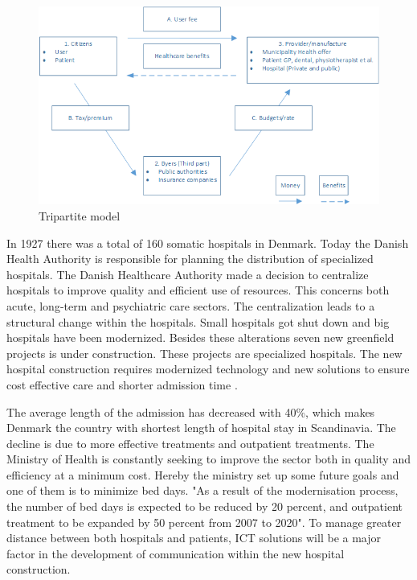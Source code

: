 \begin{figure}[H]
\centering
\includegraphics[width=1\textwidth]{Figure/thirdpart.png}
\caption{Tripartite model \cite{sundhedsvaesen}}
\label{Trepartmodel}
\end{figure} 

In 1927 there was a total of 160 somatic hospitals in Denmark. Today the Danish Health Authority is responsible for planning the distribution of specialized hospitals. The Danish Healthcare Authority made a decision to centralize hospitals to improve quality and efficient use of resources. This concerns both acute, long-term and psychiatric care sectors.
The centralization leads to a structural change within the hospitals. Small hospitals got shut down and big hospitals have been modernized. Besides these alterations seven new greenfield projects is under construction. These projects are specialized hospitals. The new hospital construction requires modernized technology and new solutions to ensure cost effective care and shorter admission time \cite{Healthcareindk2}. 

The average length of the admission has decreased with 40\%, which makes Denmark the country with shortest length of hospital stay in Scandinavia. The decline is due to more effective treatments and outpatient treatments. The Ministry of Health is constantly seeking to improve the sector both in quality and efficiency at a minimum cost. Hereby the ministry set up some future goals and one of them is to minimize bed days. "As a result of the modernisation process, the number of bed days is expected to be reduced by 20 percent, and outpatient treatment to be expanded by 50 percent from 2007 to 2020". To manage greater distance between both hospitals and patients, ICT solutions will be a major factor in the development of communication within the new hospital construction\cite{DKhealthreview, Healthcareindk2}. 

